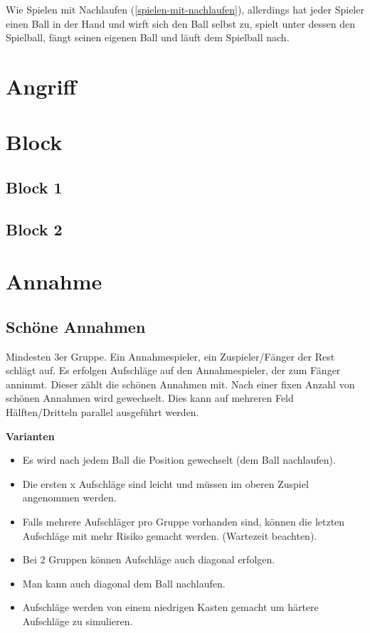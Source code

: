 \documentclass[]{book}
\providecommand{\tightlist}{%
  \setlength{\itemsep}{0pt}\setlength{\parskip}{0pt}}
\begin{document}
Wie Spielen mit Nachlaufen (\ref{spielen-mit-nachlaufen}), allerdings
hat jeder Spieler einen Ball in der Hand und wirft sich den Ball selbst
zu, spielt unter dessen den Spielball, fängt seinen eigenen Ball und
läuft dem Spielball nach.

\chapter{Angriff}\label{angriff}

\chapter{Block}\label{block}

\section{Block 1}\label{block-1}

\section{Block 2}\label{block-2}

\chapter{Annahme}\label{annahme}

\section{Schöne Annahmen}\label{schone-annahmen}

Mindesten 3er Gruppe. Ein Annahmespieler, ein Zuspieler/Fänger der Rest
schlägt auf. Es erfolgen Aufschläge auf den Annahmespieler, der zum
Fänger annimmt. Dieser zählt die schönen Annahmen mit. Nach einer fixen
Anzahl von schönen Annahmen wird gewechselt. Dies kann auf mehreren Feld
Hälften/Dritteln parallel ausgeführt werden.

\textbf{Varianten}

\begin{itemize}
\tightlist
\item
  Es wird nach jedem Ball die Position gewechselt (dem Ball nachlaufen).
\item
  Die ersten x Aufschläge sind leicht und müssen im oberen Zuspiel
  angenommen werden.
\item
  Falls mehrere Aufschläger pro Gruppe vorhanden sind, können die
  letzten Aufschläge mit mehr Risiko gemacht werden. (Wartezeit
  beachten).
\item
  Bei 2 Gruppen können Aufschläge auch diagonal erfolgen.
\item
  Man kann auch diagonal dem Ball nachlaufen.
\item
  Aufschläge werden von einem niedrigen Kasten gemacht um härtere
  Aufschläge zu simulieren.
\end{itemize}
\end{document}
